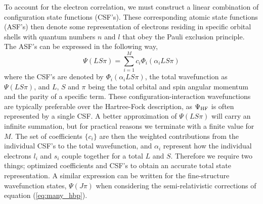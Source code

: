 To account for the electron correlation, we must construct a linear combination of configuration state functions (CSF's). These corresponding atomic state functions (ASF's) then denote some representation of electrons residing in specific orbital shells with quantum numbers $n$ and $l$ that obey the Pauli exclusion principle. The ASF's can be expressed in the following way,
	\begin{equation}\label{eq:many_ciwave}
	\Psi(LS\pi)=\sum_{i=1}^Mc_i\Phi_i(\alpha_iLS\pi)
	\end{equation}
where the CSF's are denoted by $\Phi_i(\alpha_iLS\pi)$, the total wavefunction as $\Psi(LS\pi)$, and $L$, $S$ and $\pi$ being the total orbital and spin angular momentum and the parity of a specific term. These configuration-interaction wavefunctions are typically preferable over the Hartree-Fock description, as $\Psi_{{\rm HF}}$ is often represented by a single CSF. A better approximation of $\Psi(LS\pi)$ will carry an infinite summation, but for practical reasons we terminate with a finite value for $M$. The set of coefficients $\{c_i\}$ are then the weighted contributions from the individual CSF's to the total wavefunction, and $\alpha_i$ represent how the individual electrons $l_i$ and $s_i$ couple together for a total $L$ and $S$. Therefore we require two things; optimized coefficients and CSF's to obtain an accurate total state representation. A similar expression can be written for the fine-structure wavefunction states, $\Psi(J\pi)$ when considering the semi-relativistic corrections of equation (\ref{eq:many_hbp}).\\


